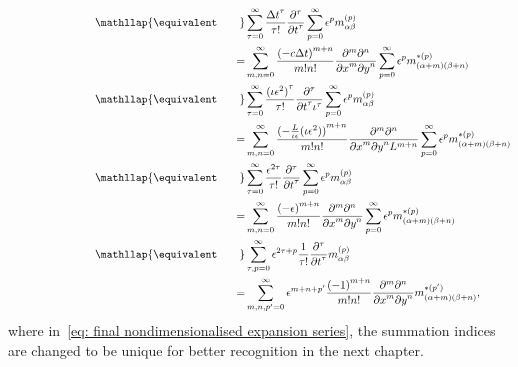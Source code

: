 \begin{align}
  \phantom{\equivalent\qquad}
  &\begin{aligned}
  \nonumber
    \mathllap{\equivalent\qquad} & \sum_{\tau = 0}^\infty \frac{{\Delta t}^\tau }{\tau!}  \frac{\partial^\tau}{{\partial t}^\tau} \sum_{p=0}^{\infty} \epsilon^p m_{\alpha\beta}^{(p)} \\
    = &{}\sum_{m,n = 0}^\infty \frac{{(-c\Delta t)}^{m+n}} {m!n!} \frac{\partial^m \partial^n}{ {\partial x}^m{\partial y}^n} \sum_{p=0}^{\infty} \epsilon^p m_{(\alpha + m)(\beta + n)}^{*(p)}
  \end{aligned}\\
  &\begin{aligned}
    \label{eq: nondimensionalised expansion series}
    \mathllap{\equivalent\qquad} &
    \sum_{\tau = 0}^\infty \frac{{(\iota\epsilon^2)}^\tau }{\tau!} \frac{\partial^\tau}{{\partial t}^\tau \iota^\tau} \sum_{p=0}^{\infty} \epsilon^p m_{\alpha\beta}^{(p)} \\
    = &{}\sum_{m,n = 0}^\infty \frac{{(-\frac{L}{\iota\epsilon}(\iota\epsilon^2))}^{m+n}} {m!n!}
    \frac{\partial^m \partial^n}{ {\partial x}^m{\partial y}^n L^{m+n}} \sum_{p=0}^{\infty} \epsilon^p m_{(\alpha + m)(\beta + n)}^{*(p)}
  \end{aligned} \\
  &\begin{aligned}
  \nonumber
    \mathllap{\equivalent\qquad} &
    \sum_{\tau = 0}^\infty \frac{\epsilon^{2\tau} }{\tau!} \frac{\partial^\tau}{{\partial t}^\tau} \sum_{p=0}^{\infty} \epsilon^p m_{\alpha\beta}^{(p)} \\
    = &{}\sum_{m,n = 0}^\infty \frac{{(-\epsilon)}^{m+n}} {m!n!}
    \frac{\partial^m \partial^n}{ {\partial x}^m{\partial y}^n } \sum_{p=0}^{\infty} \epsilon^p m_{(\alpha + m)(\beta + n)}^{*(p)}
  \end{aligned} \\
  &\begin{aligned}
    \label{eq: final nondimensionalised expansion series}
    \mathllap{\equivalent\qquad} &
    \sum_{\tau, p = 0}^\infty\epsilon^{2\tau + p} \frac{1} {\tau!} \frac{\partial^\tau}{{\partial t}^\tau} m_{\alpha\beta}^{(p)} \\
    = &{} \sum_{m,n,p' = 0}^\infty  \epsilon^{m+n+p'} \frac{{(-1)}^{m+n}} {m!n!}
    \frac{\partial^m \partial^n}{ {\partial x}^m{\partial y}^n } m_{(\alpha + m)(\beta + n)}^{*(p')},
  \end{aligned}
\end{align}
where in~\eqref{eq: final nondimensionalised expansion series}, the summation indices are changed to be unique for better recognition in the next chapter.
